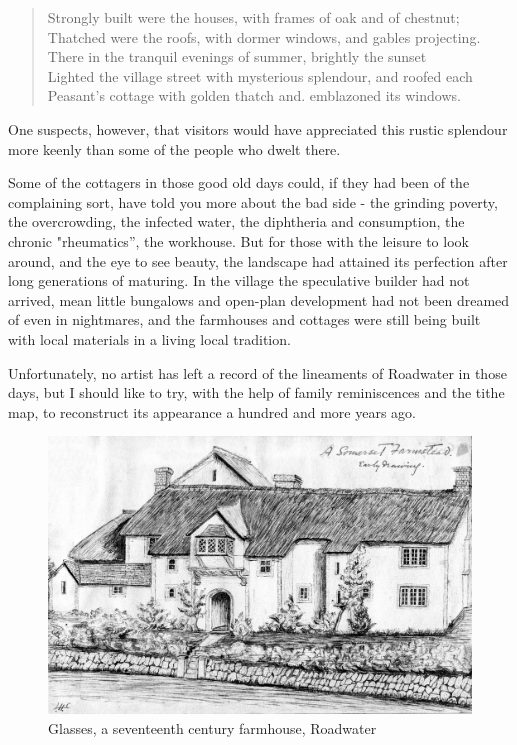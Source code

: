 \begin{quote}
Strongly built were the houses, with frames of oak and of chestnut; \\
Thatched were the roofs, with dormer windows, and gables projecting. \\
There in the tranquil evenings of summer, brightly the sunset \\
Lighted the village street with mysterious splendour, and roofed each  \\
Peasant’s cottage with golden thatch and. emblazoned its windows.
\end{quote}

One suspects, however, that visitors would have appreciated this rustic splendour more keenly than some of the people who dwelt there. 

Some of the cottagers in those good old days could, if they had been of the complaining sort, have told you more about the bad side - the grinding poverty, the overcrowding, the infected water, the diphtheria and consumption, the chronic "rheumatics”, the workhouse. But for those with the leisure to look around, and the eye to see beauty, the landscape had attained its perfection after long generations of maturing. In the village the speculative builder had not arrived, mean little bungalows and open-plan development had not been dreamed of even in nightmares, and the farmhouses and cottages were still being built with local materials in a living local tradition.

Unfortunately, no artist has left a record of the lineaments of Roadwater in those days, but I should like to try, with the help of family reminiscences and the tithe map, to reconstruct its appearance a hundred and more years ago.

\begin{figure}[]
     \includegraphics[width=1\textwidth]{figures/Glasses}
     \caption{Glasses, a seventeenth century farmhouse, Roadwater}
     \label{fig:Glasses}
\end{figure}


